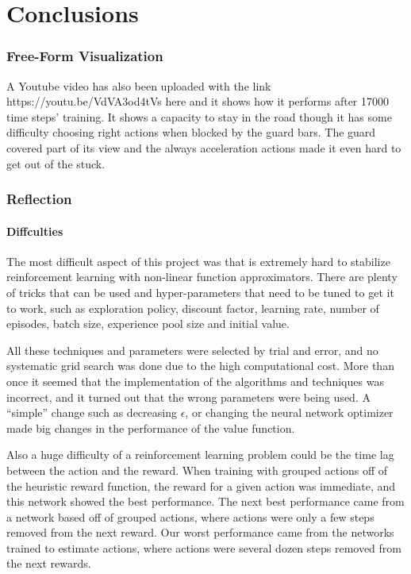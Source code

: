 \chapter{Conclusions}

\subsection{Free-Form Visualization}

A Youtube video has also been uploaded with the link https://youtu.be/VdVA3od4tVs here and it shows how it performs after 17000 time steps' training. It shows a capacity to stay in the road though it has some difficulty choosing right actions when blocked by the guard bars. The guard covered part of its view and the always acceleration actions made it even hard to get out of the stuck.

\subsection{Reflection}

\subsubsection{Diffculties}

The most difficult aspect of this project was that is extremely hard to stabilize reinforcement learning with non-linear function approximators. There are plenty of tricks that can be used and hyper-parameters that need to be tuned to get it to work, such as exploration policy, discount factor, learning rate, number of episodes, batch size, experience pool size and initial value.

All these techniques and parameters were selected by trial and error, and no systematic grid search was done due to the high computational cost. More than once it seemed that the implementation of the algorithms and techniques was incorrect, and it turned out that the wrong parameters were being used. A ``simple'' change such as decreasing $\epsilon$, or changing the neural network optimizer made big changes in the performance of the value function.

Also a huge difficulty of a reinforcement learning problem could be the time lag between the action and the reward. When training with grouped actions off of the heuristic reward function, the reward for a given action was immediate, and this network showed the best performance. The next best performance came from a network based off of grouped actions, where actions were only a few steps removed from the next reward. Our worst performance came from the networks trained to estimate actions, where actions were several dozen steps removed from the next rewards.

